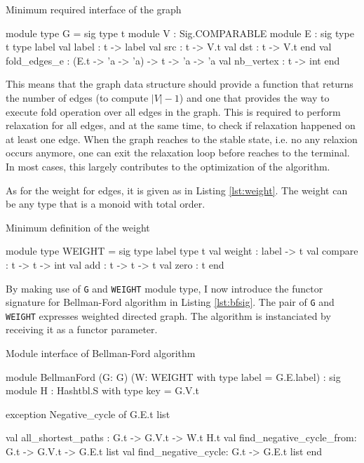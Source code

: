 \documentclass[a4paper,12pt]{article}
\begin{document}
\setcounter{algorithm}{0}
\begin{algorithm}
\caption{Minimum required interface of the graph}\label{lst:graph}
\begin{ocaml}
module type G = sig
  type t
  module V : Sig.COMPARABLE
  module E : sig
    type t
    type label
    val label : t -> label
    val src : t -> V.t
    val dst : t -> V.t
  end
  val fold_edges_e : (E.t -> 'a -> 'a) -> t -> 'a -> 'a
  val nb_vertex : t -> int
end
\end{ocaml}
\end{algorithm}

This means that the graph data structure should provide a function
that returns the number of edges (to compute $|V|-1$) and one that
provides the way to execute fold operation over all edges in the
graph. This is required to perform relaxation for all edges, and at
the same time, to check if relaxation happened on at least one
edge. When the graph reaches to the stable state, i.e. no any relaxion
occurs anymore, one can exit the relaxation loop before reaches to the
terminal. In most cases, this largely contributes to the optimization
of the algorithm.

As for the weight for edges, it is given as in Listing
\ref{lst:weight}. The weight can be any type that is a monoid with
total order.

\begin{algorithm}
\caption{Minimum definition of the weight}\label{lst:weight}
\begin{ocaml}
module type WEIGHT = sig
  type label
  type t
  val weight : label -> t
  val compare : t -> t -> int
  val add : t -> t -> t
  val zero : t
end
\end{ocaml}
\end{algorithm}

By making use of \texttt{G} and \texttt{WEIGHT} module type, I now
introduce the functor signature for Bellman-Ford algorithm in Listing
\ref{lst:bfsig}. The pair of \texttt{G} and \texttt{WEIGHT} expresses
weighted directed graph. The algorithm is instanciated by receiving it
as a functor parameter.

\begin{algorithm}
\caption{Module interface of Bellman-Ford algorithm}\label{lst:bfsig}
\begin{ocaml}
module BellmanFord
  (G: G)
  (W: WEIGHT with type label = G.E.label) :
sig
  module H : Hashtbl.S with type key = G.V.t

  exception Negative_cycle of G.E.t list

  val all_shortest_paths : G.t -> G.V.t -> W.t H.t
  val find_negative_cycle_from: G.t -> G.V.t -> G.E.t list
  val find_negative_cycle: G.t -> G.E.t list
end
\end{ocaml}
\end{algorithm}
\end{document}

